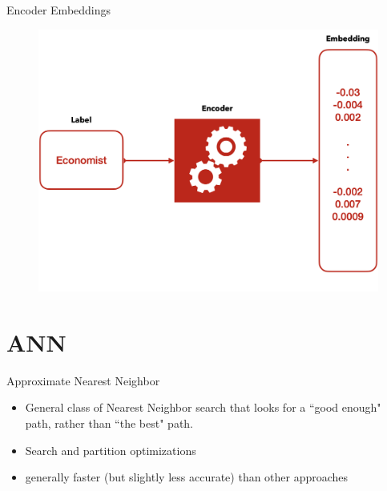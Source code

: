 \documentclass{beamer}
\begin{document}
\begin{frame}{Encoder Embeddings} 
    
    \begin{figure}
       \centering
        \includegraphics[width=.8\linewidth]{images/encoder.jpeg}
        \label{fig:encode}
    \end{figure}
    \vfill
\end{frame}




\section{ANN}
\begin{frame}{Approximate Nearest Neighbor}
\begin{itemize}
    \item General class of Nearest Neighbor search that looks for a ``good enough" path, rather than ``the best" path. 
    \item Search and partition optimizations 
    \item generally faster (but slightly less accurate) than other approaches

\end{itemize}
\end{frame}
\end{document}

